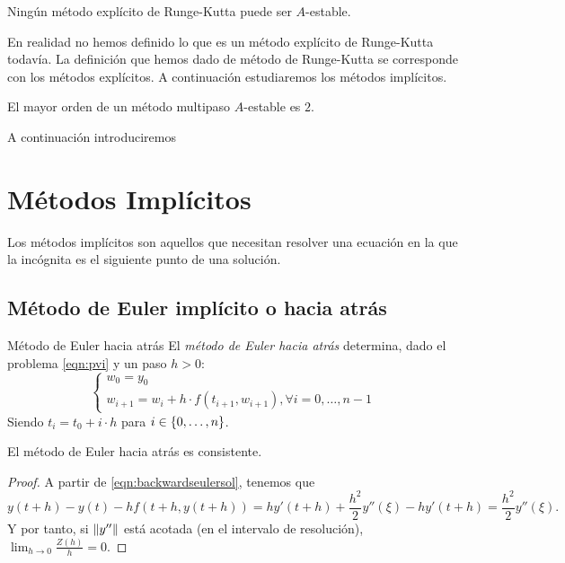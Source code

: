 
\begin{theorem}
    Ningún método explícito de Runge-Kutta puede ser $A$-estable.
\end{theorem}

\begin{remark}
    En realidad no hemos definido lo que es
    un método explícito de Runge-Kutta todavía.
    La definición que hemos dado de método de Runge-Kutta
    se corresponde con los métodos explícitos.
    A continuación estudiaremos los métodos implícitos.
\end{remark}

\begin{theorem}
    El mayor orden de un método multipaso $A$-estable es $2$.
\end{theorem}

A continuación introduciremos

\section{Métodos Implícitos}

Los métodos implícitos son aquellos que
necesitan resolver una ecuación en la que la incógnita
es el siguiente punto de una solución.

\subsection{Método de Euler implícito o hacia atrás}

\begin{method}{Método de Euler hacia atrás}
    El \emph{método de Euler hacia atrás} determina,
    dado el problema \ref{eqn:pvi} y un paso $h > 0$:
%
    \begin{equation}\label{eqn:backwardseulersol}
    \begin{cases}
        w_0 = y_0 \\
        w_{i+1} = w_i + h\cdot f(t_{i+1}, w_{i+1}), \forall i=0,\dots, n-1
    \end{cases}
    \end{equation}
%
    Siendo $t_i = t_0 + i\cdot h$ para $i \in \qty{0,\ldots, n}$.
\end{method}


\begin{proposition}
    El método de Euler hacia atrás es consistente.

\begin{proof}
    A partir de \eqref{eqn:backwardseulersol}, tenemos que 
    \begin{equation*}
        y(t + h) - y(t) - hf(t+h, y(t+h)) =
        hy'(t + h) + \frac{h^2}{2}y''(\xi) - hy'(t+h) =
        \frac{h^2}{2}y''(\xi).
    \end{equation*}
    Y por tanto, si $\norm{y''}$ está acotada (en el intervalo de resolución),
    $\lim_{h \to 0} \frac{Z(h)}{h} = 0$.
\end{proof}
\end{proposition}

